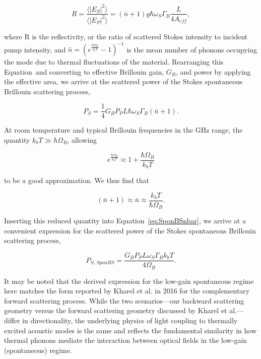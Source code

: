 \begin{equation}
  R = \frac{\langle|E_{S}|^{2}\rangle}{\langle|E_{P}|^{2}\rangle} = (\bar{n} + 1)g\hbar\omega_{S}\Gamma_{B}\frac{L}{4A_{eff}},
\end{equation}

where R is the reflectivity, or the ratio of scattered Stokes intensity to incident pump intensity, and $\bar{n} = (e^{\frac{\hbar\Omega_{B}}{k_{b}T}} - 1)^{-1}$ is the mean number of phonons occupying the mode due to thermal fluctuations of the material. Rearranging this Equation~and converting to effective Brillouin gain, $G_{B}$, and power by applying the effective area, we arrive at the scattered power of the Stokes spontaneous Brillouin scattering process,

\begin{equation}
  P_S = \frac{1}{4}G_{B}P_{P}L\hbar\omega_{S}\Gamma_{B}(\bar{n} + 1).
  \label{eq:SponBSnbar}
\end{equation}

At room temperature and typical Brillouin frequencies in the GHz range, the quantity $k_{b}T \gg \hbar\Omega_{B}$, allowing

\begin{equation}
e^{\frac{\hbar\Omega_{B}}{k_{b}T}} \approx 1 + \frac{\hbar\Omega_{B}}{k_{b}T}
\end{equation}

to be a good approximation. We thus find that

\begin{equation}
(\bar{n} + 1) \approx \bar{n} \approx \frac{k_{b}T}{\hbar\Omega_{B}}.
\end{equation}

Inserting this reduced quantity into Equation~\ref{eq:SponBSnbar}, we arrive at a convenient expression for the scattered power of the Stokes spontaneous Brillouin scattering process,

\begin{equation}
  P_{S, \,\textit{SponBS}} = \frac{G_{B}P_{P}L\omega_{S}\Gamma_{B}k_{b}T}{4\Omega_{B}}.
  \label{eq:sponBSscatteredPower}
\end{equation}

It may be noted that the derived expression for the low-gain spontaneous regime here matches the form reported by Kharel et al. in 2016 \cite{kharel2016noise} for the complementary forward scattering process. While the two scenarios—our backward scattering geometry versus the forward scattering geometry discussed by Kharel et al.—differ in directionality, the underlying physics of light coupling to thermally excited acoustic modes is the same and reflects the fundamental similarity in how thermal phonons mediate the interaction between optical fields in the low-gain (spontaneous) regime.

